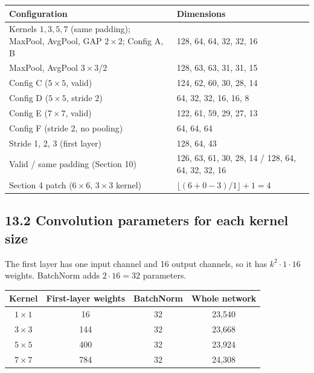 \documentclass[12pt,a4paper]{article}
\begin{document}
\begin{center}
\renewcommand{\arraystretch}{1.2}\footnotesize
\begin{tabular}{|p{8.2cm}|p{6.4cm}|}
\hline
\textbf{Configuration} & \textbf{Dimensions} \\ \hline
Kernels $1,3,5,7$ (same padding); MaxPool, AvgPool, GAP $2\times2$; Config A, B & 128, 64, 64, 32, 32, 16 \\ \hline
MaxPool, AvgPool $3\times3$/2 & 128, 63, 63, 31, 31, 15 \\ \hline
Config C ($5\times5$, valid) & 124, 62, 60, 30, 28, 14 \\ \hline
Config D ($5\times5$, stride 2) & 64, 32, 32, 16, 16, 8 \\ \hline
Config E ($7\times7$, valid) & 122, 61, 59, 29, 27, 13 \\ \hline
Config F (stride 2, no pooling) & 64, 64, 64 \\ \hline
Stride 1, 2, 3 (first layer) & 128, 64, 43 \\ \hline
Valid / same padding (Section 10) & 126, 63, 61, 30, 28, 14 / 128, 64, 64, 32, 32, 16 \\ \hline
Section 4 patch ($6\times6$, $3\times3$ kernel) & $\lfloor (6+0-3)/1\rfloor+1=4$ \\ \hline
\end{tabular}
\end{center}

\subsection*{13.2 Convolution parameters for each kernel size}

The first layer has one input channel and 16 output channels, so it has $k^2\cdot1\cdot16$ weights.
BatchNorm adds $2\cdot16=32$ parameters.

\begin{center}
\renewcommand{\arraystretch}{1.2}\footnotesize
\begin{tabular}{|c|c|c|c|}
\hline
\textbf{Kernel} & \textbf{First-layer weights} & \textbf{BatchNorm} & \textbf{Whole network} \\ \hline
$1\times1$ & 16 & 32 & 23,540 \\ \hline
$3\times3$ & 144 & 32 & 23,668 \\ \hline
$5\times5$ & 400 & 32 & 23,924 \\ \hline
$7\times7$ & 784 & 32 & 24,308 \\ \hline
\end{tabular}
\end{center}
\end{document}
